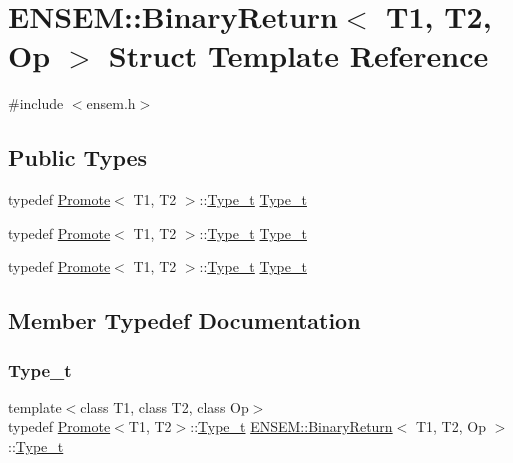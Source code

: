 \hypertarget{structENSEM_1_1BinaryReturn}{}\section{E\+N\+S\+EM\+:\+:Binary\+Return$<$ T1, T2, Op $>$ Struct Template Reference}
\label{structENSEM_1_1BinaryReturn}


{\ttfamily \#include $<$ensem.\+h$>$}

\subsection*{Public Types}
\begin{DoxyCompactItemize}
\item 
typedef \mbox{\hyperlink{structENSEM_1_1Promote}{Promote}}$<$ T1, T2 $>$\+::\mbox{\hyperlink{structENSEM_1_1BinaryReturn_a8e4e01e2c9cd832cfe1a41a67305ac06}{Type\+\_\+t}} \mbox{\hyperlink{structENSEM_1_1BinaryReturn_a8e4e01e2c9cd832cfe1a41a67305ac06}{Type\+\_\+t}}
\item 
typedef \mbox{\hyperlink{structENSEM_1_1Promote}{Promote}}$<$ T1, T2 $>$\+::\mbox{\hyperlink{structENSEM_1_1BinaryReturn_a8e4e01e2c9cd832cfe1a41a67305ac06}{Type\+\_\+t}} \mbox{\hyperlink{structENSEM_1_1BinaryReturn_a8e4e01e2c9cd832cfe1a41a67305ac06}{Type\+\_\+t}}
\item 
typedef \mbox{\hyperlink{structENSEM_1_1Promote}{Promote}}$<$ T1, T2 $>$\+::\mbox{\hyperlink{structENSEM_1_1BinaryReturn_a8e4e01e2c9cd832cfe1a41a67305ac06}{Type\+\_\+t}} \mbox{\hyperlink{structENSEM_1_1BinaryReturn_a8e4e01e2c9cd832cfe1a41a67305ac06}{Type\+\_\+t}}
\end{DoxyCompactItemize}


\subsection{Member Typedef Documentation}
\mbox{\label{structENSEM_1_1BinaryReturn_a8e4e01e2c9cd832cfe1a41a67305ac06}} 
\subsubsection{\texorpdfstring{Type\_t}{Type\_t}\hspace{0.1cm}{\footnotesize\ttfamily [1/3]}}
{\footnotesize\ttfamily template$<$class T1, class T2, class Op$>$ \\
typedef \mbox{\hyperlink{structENSEM_1_1Promote}{Promote}}$<$T1, T2$>$\+::\mbox{\hyperlink{structENSEM_1_1BinaryReturn_a8e4e01e2c9cd832cfe1a41a67305ac06}{Type\+\_\+t}} \mbox{\hyperlink{structENSEM_1_1BinaryReturn}{E\+N\+S\+E\+M\+::\+Binary\+Return}}$<$ T1, T2, Op $>$\+::\mbox{\hyperlink{structENSEM_1_1BinaryReturn_a8e4e01e2c9cd832cfe1a41a67305ac06}{Type\+\_\+t}}}

